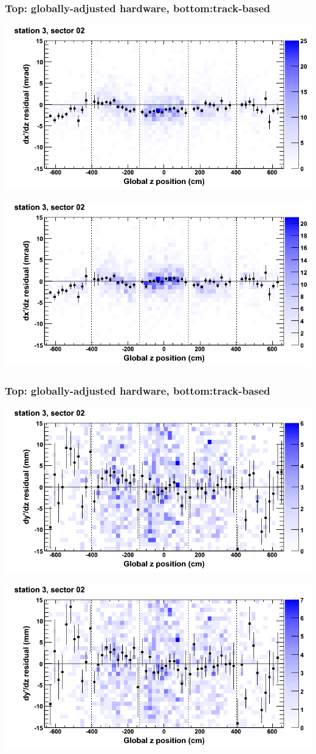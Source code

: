 \documentclass[compress]{beamer}
\begin{document}
\begin{frame}
\frametitle{Top: globally-adjusted hardware, bottom:track-based}
\includegraphics[width=0.7\linewidth]{NOV4_mapplots_HW/DTvsz_st3sec02_dxdz.png}

\includegraphics[width=0.7\linewidth]{NOV4_mapplots/DTvsz_st3sec02_dxdz.png}
\end{frame}

\begin{frame}
\frametitle{Top: globally-adjusted hardware, bottom:track-based}
\includegraphics[width=0.7\linewidth]{NOV4_mapplots_HW/DTvsz_st3sec02_dydz.png}

\includegraphics[width=0.7\linewidth]{NOV4_mapplots/DTvsz_st3sec02_dydz.png}
\end{frame}
\end{document}
